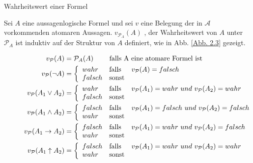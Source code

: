 \begin{defi}Wahrheitswert einer Formel\end{defi} Sei  $A$ eine aussagenlogische Formel und sei $v$ eine Belegung der in $\mathcal{A}$ vorkommenden atomaren Aussagen.  $v_{\mathcal{P}_A} (A)$  , der Wahrheitswert von $A$ unter  $\mathcal{P}_A$ ist induktiv auf der Struktur von $A$ definiert, wie in Abb. \ref{Abb. 2.3} gezeigt.
\begin{figure}[ !h] \centering		
\begin{align*}
v_\mathcal{P}(A)  &= \mathcal{P}_A (A)\hspace{0.7cm} \mbox{ falls A eine atomare Formel ist}\\
v_\mathcal{P}(\neg A)  &= \left\{ \begin{array}{lll}
wahr & \mbox{falls}& v_\mathcal{P}(A) = falsch \\ 
falsch & \mbox{sonst} & \\
\end{array}\right.\\
v_\mathcal{P}(A_1 \vee A_2)  &= \left\{ \begin{array}{lll}
wahr & \mbox{falls}& v_\mathcal{P}(A_1) = wahr \ und \ v_\mathcal{P}(A_2) = wahr \\ 
falsch & \mbox{sonst} & \\
\end{array}\right.\\
v_\mathcal{P}(A_1 \wedge A_2)  &= \left\{ \begin{array}{lll}
falsch & \mbox{falls}& v_\mathcal{P}(A_1) = falsch \ und \ v_\mathcal{P}(A_2) = falsch \\ 
wahr & \mbox{sonst} & \\
\end{array}\right.\\
v_\mathcal{P}(A_1 \rightarrow A_2)  &= \left\{ \begin{array}{lll}
falsch & \mbox{falls}& v_\mathcal{P}(A_1) = wahr \ und \ v_\mathcal{P}(A_2) = falsch \\ 
wahr & \mbox{sonst} & \\
\end{array}\right.\\
v_\mathcal{P}(A_1 \uparrow A_2)  &= \left\{ \begin{array}{lll}
falsch & \mbox{falls}& v_\mathcal{P}(A_1) = wahr \ und \ v_\mathcal{P}(A_2) = wahr \\ 
wahr & \mbox{sonst} & \\
\end{array}\right.\\

\end{align*}
\end{figure}
